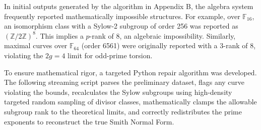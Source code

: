 \documentclass[letterpaper, 11pt]{article}
\begin{document}
In initial outputs generated by the algorithm in Appendix B, the algebra system frequently reported mathematically impossible structures. For example, over $\mathbb{F}_{16}$, an isomorphism class with a Sylow-2 subgroup of order 256 was reported as $(\mathbb{Z}/2\mathbb{Z})^8$. This implies a $p$-rank of 8, an algebraic impossibility. Similarly, maximal curves over $\mathbb{F}_{64}$ (order 6561) were originally reported with a 3-rank of 8, violating the $2g=4$ limit for odd-prime torsion. 

To ensure mathematical rigor, a targeted Python repair algorithm was developed. The following streaming script parses the preliminary dataset, flags any curve violating the bounds, recalculates the Sylow subgroups using high-density targeted random sampling of divisor classes, mathematically clamps the allowable subgroup rank to the theoretical limits, and correctly redistributes the prime exponents to reconstruct the true Smith Normal Form.
\end{document}
